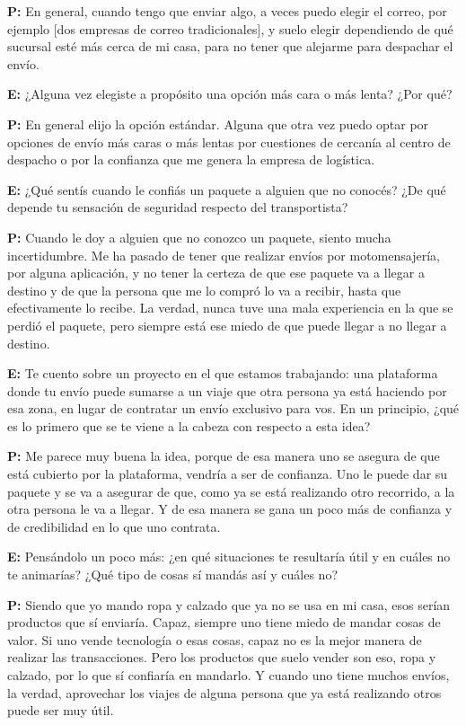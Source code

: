 {\noindent\textbf{P:} En general, cuando tengo que enviar algo, a veces puedo elegir el correo, por ejemplo [dos empresas de correo tradicionales], y suelo elegir dependiendo de qué sucursal esté más cerca de mi casa, para no tener que alejarme para despachar el envío.

\noindent\textbf{E:} ¿Alguna vez elegiste a propósito una opción más cara o más lenta? ¿Por qué?

\noindent\textbf{P:} En general elijo la opción estándar. Alguna que otra vez puedo optar por opciones de envío más caras o más lentas por cuestiones de cercanía al centro de despacho o por la confianza que me genera la empresa de logística.

\noindent\textbf{E:} ¿Qué sentís cuando le confiás un paquete a alguien que no conocés? ¿De qué depende tu sensación de seguridad respecto del transportista?

\noindent\textbf{P:} Cuando le doy a alguien que no conozco un paquete, siento mucha incertidumbre. Me ha pasado de tener que realizar envíos por motomensajería, por alguna aplicación, y no tener la certeza de que ese paquete va a llegar a destino y de que la persona que me lo compró lo va a recibir, hasta que efectivamente lo recibe. La verdad, nunca tuve una mala experiencia en la que se perdió el paquete, pero siempre está ese miedo de que puede llegar a no llegar a destino.

\noindent\textbf{E:} Te cuento sobre un proyecto en el que estamos trabajando: una plataforma donde tu envío puede sumarse a un viaje que otra persona ya está haciendo por esa zona, en lugar de contratar un envío exclusivo para vos. En un principio, ¿qué es lo primero que se te viene a la cabeza con respecto a esta idea?

\noindent\textbf{P:} Me parece muy buena la idea, porque de esa manera uno se asegura de que está cubierto por la plataforma, vendría a ser de confianza. Uno le puede dar su paquete y se va a asegurar de que, como ya se está realizando otro recorrido, a la otra persona le va a llegar. Y de esa manera se gana un poco más de confianza y de credibilidad en lo que uno contrata.

\noindent\textbf{E:} Pensándolo un poco más: ¿en qué situaciones te resultaría útil y en cuáles no te animarías? ¿Qué tipo de cosas sí mandás así y cuáles no?

\noindent\textbf{P:} Siendo que yo mando ropa y calzado que ya no se usa en mi casa, esos serían productos que sí enviaría. Capaz, siempre uno tiene miedo de mandar cosas de valor. Si uno vende tecnología o esas cosas, capaz no es la mejor manera de realizar las transacciones. Pero los productos que suelo vender son eso, ropa y calzado, por lo que sí confiaría en mandarlo. Y cuando uno tiene muchos envíos, la verdad, aprovechar los viajes de alguna persona que ya está realizando otros puede ser muy útil.

}
